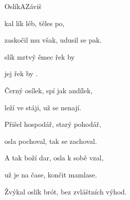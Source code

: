 \begin{song}{Oslík}{A}{Záviš}

\begin{SBVerse}

kal lík léb,  těles po,

zaskočil mu však, udusil se pak.

\end{SBVerse}

\begin{SBChorus}

slík mrtvý  ěmec řek by 

 jej   řek by .

\end{SBChorus}

\begin{SBVerse}

Černý osílek, spí jak andílek,

leží ve stáji, už se nenají.

\end{SBVerse}

\begin{SBChorus}

\end{SBChorus}

\begin{SBVerse}

Přišel hospodář, starý pohodář,

osla pochoval, tak se zachoval.

\end{SBVerse}

\begin{SBChorus}

\end{SBChorus}

\begin{SBVerse}

A tak boží dar, osla k sobě vzal,

už je na čase, končit mamlase.

\end{SBVerse}

\begin{SBChorus}

\end{SBChorus}

\begin{SBChorus*}

Žvýkal oslík brót, bez zvláštních výhod.

\end{SBChorus*}

\end{song}

\clearpage
